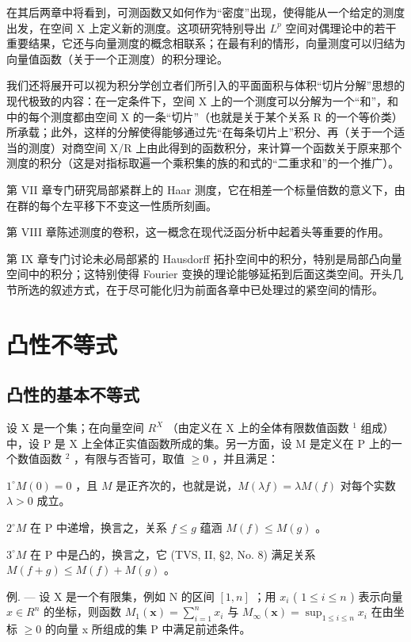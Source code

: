 在其后两章中将看到，可测函数又如何作为“密度”出现，使得能从一个给定的测度出发，在空间 X 上定义新的测度。这项研究特别导出 \(L^{p}\) 空间对偶理论中的若干重要结果，它还与向量测度的概念相联系；在最有利的情形，向量测度可以归结为向量值函数（关于一个正测度）的积分理论。

我们还将展开可以视为积分学创立者们所引入的平面面积与体积“切片分解”思想的现代极致的内容：在一定条件下，空间 X 上的一个测度可以分解为一个“和”，和中的每个测度都由空间 X 的一条“切片”（也就是关于某个关系 R 的一个等价类）所承载；此外，这样的分解使得能够通过先“在每条切片上”积分、再（关于一个适当的测度）对商空间 X/R 上由此得到的函数积分，来计算一个函数关于原来那个测度的积分（这是对指标取遍一个乘积集的族的和式的“二重求和”的一个推广）。

第 VII 章专门研究局部紧群上的 Haar 测度，它在相差一个标量倍数的意义下，由在群的每个左平移下不变这一性质所刻画。

第 VIII 章陈述测度的卷积，这一概念在现代泛函分析中起着头等重要的作用。

第 IX 章专门讨论未必局部紧的 Hausdorff 拓扑空间中的积分，特别是局部凸向量空间中的积分；这特别使得 Fourier 变换的理论能够延拓到后面这类空间。开头几节所选的叙述方式，在于尽可能化归为前面各章中已处理过的紧空间的情形。

\chapter{凸性不等式}

\section{凸性的基本不等式}

设 X 是一个集；在向量空间 \(R^{X}\) （由定义在 X 上的全体有限数值函数 \(^{1}\) 组成）中，设 P 是 X 上全体正实值函数所成的集。另一方面，设 M 是定义在 P 上的一个数值函数 \(^{2}\) ，有限与否皆可，取值 \(\geqslant0\) ，并且满足：

\(1^{\circ} M(0) = 0\) ，且 \(M\) 是正齐次的，也就是说，\(M(\lambda f) = \lambda M(f)\) 对每个实数 \(\lambda > 0\) 成立。

\(2^{\circ} M\) 在 P 中递增，换言之，关系 \(f \leqslant g\) 蕴涵 \(M(f) \leqslant M(g)\) 。

\(3^{\circ} M\) 在 P 中是凸的，换言之，它 (TVS, II, §2, No. 8) 满足关系 \(M(f + g) \leqslant M(f) + M(g)\) 。

例. --- 设 X 是一个有限集，例如 N 的区间 \([1,n]\) ；用 \(x_{i}\) ( \(1 \leqslant i \leqslant n\) ) 表示向量 \(x \in R^{n}\) 的坐标，则函数 \(M_{1}(\mathbf{x}) = \sum_{i=1}^{n} x_{i}\) 与 \(M_{\infty}(\mathbf{x}) = \sup_{1 \leqslant i \leqslant n} x_{i}\) 在由坐标 \(\geqslant 0\) 的向量 x 所组成的集 P 中满足前述条件。

